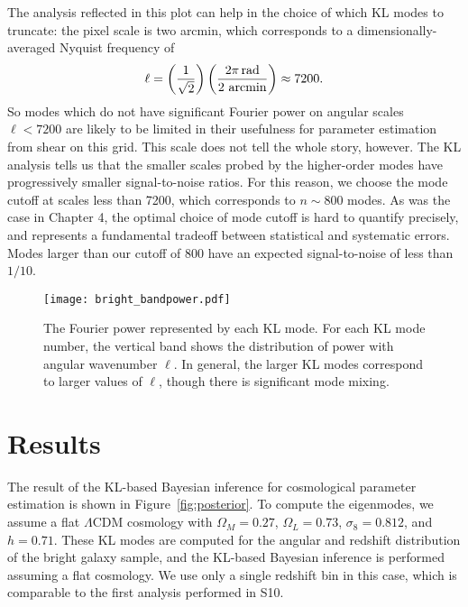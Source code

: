 The analysis reflected in this plot can help in the choice of which KL
modes to truncate: the pixel scale is two arcmin, which corresponds to
a dimensionally-averaged Nyquist frequency of
\begin{equation}
  \ell = \left(\frac{1}{\sqrt{2}}\right)
  \left(\frac{2\pi\, {\rm rad}}{2\ {\rm arcmin}}\right) \approx 7200.
\end{equation}
So modes which do not have significant Fourier power on angular scales
$\ell < 7200$ are likely to be limited in their usefulness for parameter
estimation from shear on this grid.  This scale does not tell the whole story,
however.  The KL analysis tells us that the smaller scales probed by the
higher-order modes have progressively smaller signal-to-noise ratios.  For
this reason, we choose the mode cutoff at scales less than 7200, which
corresponds to $n \sim 800$ modes.  As was the case in Chapter 4, the
optimal choice of mode cutoff is hard to quantify precisely, and represents
a fundamental tradeoff between statistical and systematic errors.
Modes larger than our cutoff of 800 have an expected signal-to-noise of
less than $1/10$.

\begin{figure*}
 \centering
 \texttt{[image: bright\_bandpower.pdf]}
 \caption{
   The Fourier power represented by each KL mode.  For each KL mode number,
   the vertical band shows the distribution of power with angular wavenumber
   $\ell$.  In general, the larger KL modes correspond to larger values of
   $\ell$, though there is significant mode mixing.
   \label{fig:bandpower_masked}}
\end{figure*}

\section{Results}
\label{sec:results}

The result of the KL-based Bayesian inference for cosmological parameter
estimation is shown in Figure~\ref{fig:posterior}.  To compute the
eigenmodes, we assume a flat $\Lambda$CDM cosmology with
$\Omega_M = 0.27$, $\Omega_L = 0.73$, $\sigma_8 = 0.812$, and $h=0.71$.
These KL modes are computed for the angular and redshift distribution
of the bright galaxy sample, and the KL-based Bayesian inference is
performed assuming a flat cosmology.  We use only a single redshift bin in
this case, which is comparable to the first analysis performed in
S10.

